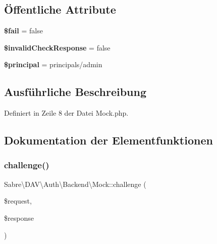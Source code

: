 \subsection*{Öffentliche Attribute}
\begin{DoxyCompactItemize}
\item 
\mbox{\label{class_sabre_1_1_d_a_v_1_1_auth_1_1_backend_1_1_mock_a2b4c080950bf5b91d2d6213983dc6432}} 
{\bfseries \$fail} = false
\item 
\mbox{\label{class_sabre_1_1_d_a_v_1_1_auth_1_1_backend_1_1_mock_ac080a835e16a8a914b9711960dc36984}} 
{\bfseries \$invalid\+Check\+Response} = false
\item 
\mbox{\label{class_sabre_1_1_d_a_v_1_1_auth_1_1_backend_1_1_mock_a98962fe66224422fd3aa6fec7ad528be}} 
{\bfseries \$principal} = \textquotesingle{}principals/admin\textquotesingle{}
\end{DoxyCompactItemize}


\subsection{Ausführliche Beschreibung}


Definiert in Zeile 8 der Datei Mock.\+php.



\subsection{Dokumentation der Elementfunktionen}
\mbox{\label{class_sabre_1_1_d_a_v_1_1_auth_1_1_backend_1_1_mock_a9b95b147eaf9b94e7de858bc4c62cc2d}} 
\subsubsection{\texorpdfstring{challenge()}{challenge()}}
{\footnotesize\ttfamily Sabre\textbackslash{}\+D\+A\+V\textbackslash{}\+Auth\textbackslash{}\+Backend\textbackslash{}\+Mock\+::challenge (\begin{DoxyParamCaption}\item[{\mbox{\hyperlink{interface_sabre_1_1_h_t_t_p_1_1_request_interface}{Request\+Interface}}}]{\$request,  }\item[{\mbox{\hyperlink{interface_sabre_1_1_h_t_t_p_1_1_response_interface}{Response\+Interface}}}]{\$response }\end{DoxyParamCaption})}

